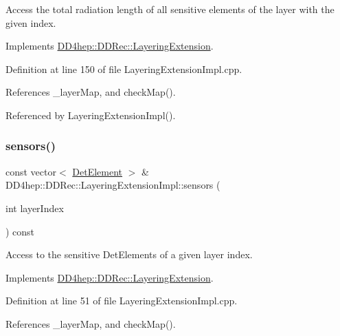 Access the total radiation length of all sensitive elements of the layer with the given index. 



Implements \hyperlink{class_d_d4hep_1_1_d_d_rec_1_1_layering_extension_a1328587b943abe82353de131d9fac071}{D\+D4hep\+::\+D\+D\+Rec\+::\+Layering\+Extension}.



Definition at line 150 of file Layering\+Extension\+Impl.\+cpp.



References \+\_\+layer\+Map, and check\+Map().



Referenced by Layering\+Extension\+Impl().

\hypertarget{class_d_d4hep_1_1_d_d_rec_1_1_layering_extension_impl_a3869b997ee9ebc7f63bef3ad50000a6a}{}\label{class_d_d4hep_1_1_d_d_rec_1_1_layering_extension_impl_a3869b997ee9ebc7f63bef3ad50000a6a} 
\subsubsection{\texorpdfstring{sensors()}{sensors()}}
{\footnotesize\ttfamily const vector$<$ \hyperlink{class_d_d4hep_1_1_geometry_1_1_det_element}{Det\+Element} $>$ \& D\+D4hep\+::\+D\+D\+Rec\+::\+Layering\+Extension\+Impl\+::sensors (\begin{DoxyParamCaption}\item[{int}]{layer\+Index }\end{DoxyParamCaption}) const\hspace{0.3cm}{\ttfamily [virtual]}}



Access to the sensitive Det\+Elements of a given layer index. 



Implements \hyperlink{class_d_d4hep_1_1_d_d_rec_1_1_layering_extension_a832e6f67c9e507b89f8f41d0a5cc0025}{D\+D4hep\+::\+D\+D\+Rec\+::\+Layering\+Extension}.



Definition at line 51 of file Layering\+Extension\+Impl.\+cpp.



References \+\_\+layer\+Map, and check\+Map().



